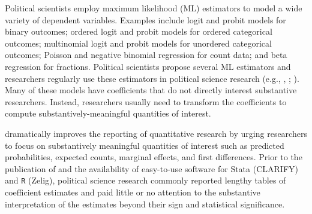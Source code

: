 \documentclass[11pt]{article}
\begin{document}


\thispagestyle{empty}

\onehalfspace



Political scientists employ maximum likelihood (ML) estimators to model a wide variety of dependent variables.
Examples include logit and probit models for binary outcomes; ordered logit and probit models for ordered categorical outcomes; multinomial logit and probit models for unordered categorical outcomes; Poisson and negative binomial regression for count data; and beta regression for fractions.
Political scientists propose several ML estimators and researchers regularly use these estimators in political science research (e.g., \citealt{Nagler1994}, \citealt{KatzKing1999}; \citealt{Mebane2000}).
Many of these models have coefficients that do not directly interest substantive researchers.
Instead, researchers usually need to transform the coefficients to compute substantively-meaningful quantities of interest.


\cite{KingTomzWittenberg2000} dramatically improves the reporting of quantitative research by urging researchers to focus on substantively meaningful quantities of interest such as predicted probabilities, expected counts, marginal effects, and first differences.
Prior to the publication of \cite{KingTomzWittenberg2000} and the availability of easy-to-use software for Stata (CLARIFY) and \texttt{R} (Zelig), political science research commonly reported lengthy tables of coefficient estimates and paid little or no attention to the substantive interpretation of the estimates beyond their sign and statistical significance.
\end{document}
